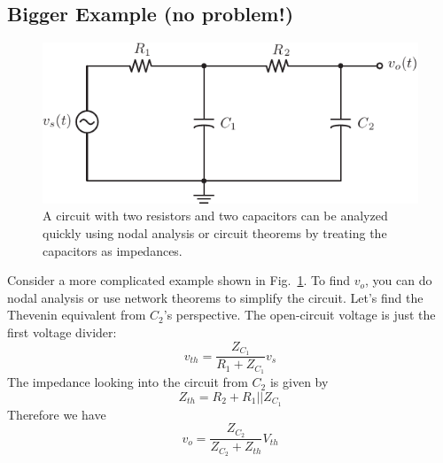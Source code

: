 \subsection{Bigger Example (no problem!)}
\begin{figure}[tb]
\centering
\includegraphics[angle=-0.0,scale=1]{mod1_3_7_rc_lpf2}
\caption{A circuit with two resistors and two capacitors can be analyzed quickly using nodal analysis or circuit theorems by treating the capacitors as impedances.}
\label{fig:bigexample}
\end{figure}
Consider a more complicated example shown in Fig.~\ref{fig:bigexample}.  To find $v_o$, you can do nodal analysis or use network theorems to simplify the circuit.  Let's find the Thevenin equivalent from $C_2$'s perspective.  The open-circuit voltage is just the first voltage divider:
    \begin{equation}
        v_{th} = \frac{Z_{C_1}}{R_1 + Z_{C_1}} v_s 
    \end{equation}
The impedance looking into the circuit from $C_2$ is given by
    \begin{equation}
        Z_{th} = R_2 + R_1 || Z_{C_1}
    \end{equation}
Therefore we have  
    \begin{equation}
        v_o = \frac{Z_{C_2}}{Z_{C_2} + Z_{th}} V_{th} 
    \end{equation}
